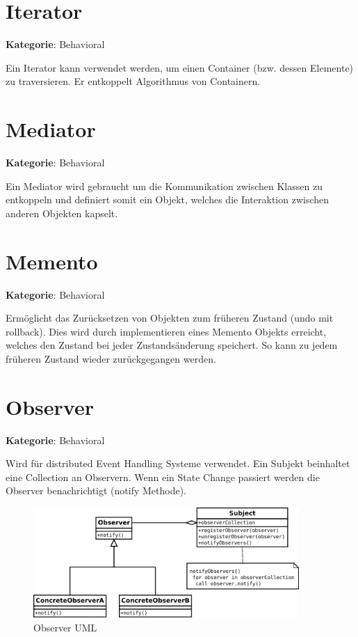\section{Iterator}
\textbf{Kategorie}: Behavioral

Ein Iterator kann verwendet werden, um einen Container (bzw. dessen Elemente) zu traversieren. Er entkoppelt Algorithmus von Containern.

\section{Mediator}
\textbf{Kategorie}: Behavioral

Ein Mediator wird gebraucht um die Kommunikation zwischen Klassen zu entkoppeln und definiert somit ein Objekt, welches die Interaktion zwischen anderen Objekten kapselt.

\section{Memento}
\textbf{Kategorie}: Behavioral

Ermöglicht das Zurücksetzen von Objekten zum früheren Zustand (undo mit rollback).
Dies wird durch implementieren eines Memento Objekts erreicht, welches den Zustand bei jeder Zustandsänderung speichert. So kann zu jedem früheren Zustand wieder zurückgegangen werden.

\section{Observer}
\textbf{Kategorie}: Behavioral

Wird für distributed Event Handling Systeme verwendet. Ein Subjekt beinhaltet eine Collection an Observern. Wenn ein State Change passiert werden die Observer benachrichtigt (notify Methode).


\begin{figure}[H]
	\centering
	\includegraphics[width=0.9\textwidth]{content/gof/images/14-observer-uml.png}
	\caption{Observer UML}
\end{figure}



